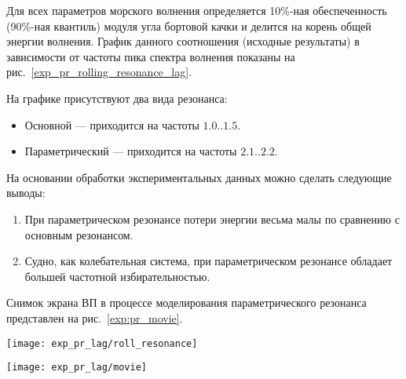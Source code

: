 Для всех параметров морского волнения определяется 10\%-ная обеспеченность (90\%-ная квантиль) модуля угла бортовой качки и делится на корень общей энергии волнения. График данного соотношения (исходные результаты) в зависимости от частоты пика спектра волнения показаны на рис.~\ref{exp_pr_rolling_resonance_lag}.

На графике присутствуют два вида резонанса:
\begin{itemize}
	\item	Основной --- приходится на частоты $1.0..1.5$.
	\item	Параметрический --- приходится на частоты $2.1..2.2$.
\end{itemize}


На основании обработки экспериментальных данных можно сделать следующие выводы:
\begin{enumerate}
	\item	При параметрическом резонансе потери энергии весьма малы по сравнению с основным резонансом. 
	\item	Судно, как колебательная система, при параметрическом резонансе обладает большей частотной избирательностью.
\end{enumerate}

Снимок экрана ВП в процессе моделирования параметрического резонанса представлен на рис.~\ref{exp:pr_movie}.

\begin{sidewaysfigure}
	\begin{center}
	\texttt{[image: exp\_pr\_lag/roll\_resonance]}
	\end{center}
	\caption{Основной и параметрический резонанс бортовой качки}
	\label{exp_pr_rolling_resonance_lag}
\end{sidewaysfigure}


\begin{sidewaysfigure}
	\begin{center}
	\texttt{[image: exp\_pr\_lag/movie]}
	\end{center}
	\caption{Опасный крен вызванный параметрическим резонансом}
	\label{exp:pr_movie}
\end{sidewaysfigure}

